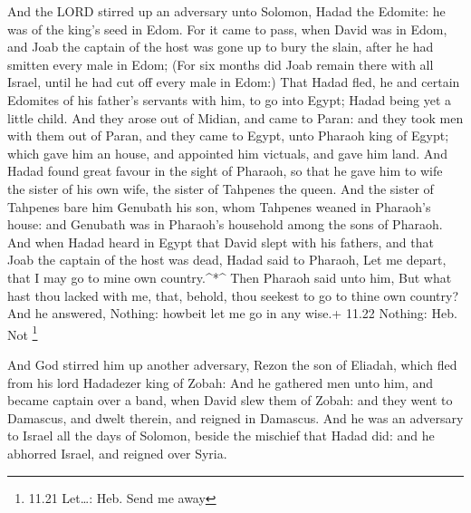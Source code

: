  And the LORD stirred up an adversary unto Solomon, Hadad
the Edomite: he was of the king's seed in Edom.  For it
came to pass, when David was in Edom, and Joab the captain of the host
was gone up to bury the slain, after he had smitten every male in Edom;
 (For six months did Joab remain there with all Israel,
until he had cut off every male in Edom:)  That Hadad fled,
he and certain Edomites of his father's servants with him, to go into
Egypt; Hadad being yet a little child.  And they arose out
of Midian, and came to Paran: and they took men with them out of Paran,
and they came to Egypt, unto Pharaoh king of Egypt; which gave him an
house, and appointed him victuals, and gave him land.  And
Hadad found great favour in the sight of Pharaoh, so that he gave him to
wife the sister of his own wife, the sister of Tahpenes the queen.
 And the sister of Tahpenes bare him Genubath his son, whom
Tahpenes weaned in Pharaoh's house: and Genubath was in Pharaoh's
household among the sons of Pharaoh.  And when Hadad heard
in Egypt that David slept with his fathers, and that Joab the captain of
the host was dead, Hadad said to Pharaoh, Let me depart, that I may go
to mine own country.\^{}*\^{}  Then Pharaoh said unto him,
But what hast thou lacked with me, that, behold, thou seekest to go to
thine own country? And he answered, Nothing: howbeit let me go in any
wise.+ 11.22 Nothing: Heb. Not \footnote{11.21 Let\ldots: Heb. Send me
  away}

 And God stirred him up another adversary, Rezon the son of
Eliadah, which fled from his lord Hadadezer king of Zobah: 
And he gathered men unto him, and became captain over a band, when David
slew them of Zobah: and they went to Damascus, and dwelt therein, and
reigned in Damascus.  And he was an adversary to Israel all
the days of Solomon, beside the mischief that Hadad did: and he abhorred
Israel, and reigned over Syria.

